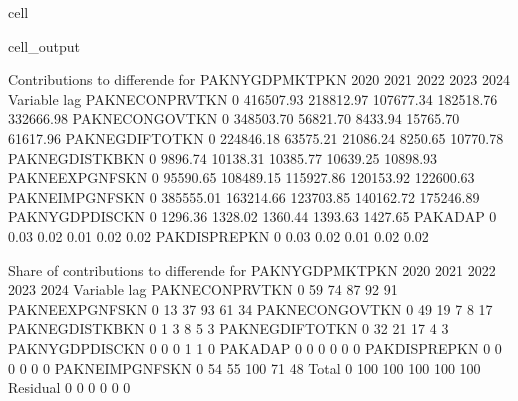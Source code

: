 \documentclass[letterpaper,10pt,english]{jupyterBook}
\begin{document}
\begin{sphinxuseclass}{cell}
\begin{sphinxVerbatimOutput}
\begin{sphinxuseclass}{cell_output}
\begin{sphinxVerbatim}[commandchars=\\\{\}]
 Contributions to differende for  PAKNYGDPMKTPKN
                         2020       2021       2022       2023       2024
Variable       lag                                                       
PAKNECONPRVTKN 0    416507.93  218812.97  107677.34  182518.76  332666.98
PAKNECONGOVTKN 0    348503.70   56821.70   \PYGZhy{}8433.94   15765.70   61617.96
PAKNEGDIFTOTKN 0    224846.18   63575.21   21086.24    8250.65   10770.78
PAKNEGDISTKBKN 0      9896.74   10138.31   10385.77   10639.25   10898.93
PAKNEEXPGNFSKN 0     95590.65  108489.15  115927.86  120153.92  122600.63
PAKNEIMPGNFSKN 0   \PYGZhy{}385555.01 \PYGZhy{}163214.66 \PYGZhy{}123703.85 \PYGZhy{}140162.72 \PYGZhy{}175246.89
PAKNYGDPDISCKN 0      1296.36    1328.02    1360.44    1393.63    1427.65
PAKADAP        0        \PYGZhy{}0.03      \PYGZhy{}0.02      \PYGZhy{}0.01      \PYGZhy{}0.02      \PYGZhy{}0.02
PAKDISPREPKN   0        \PYGZhy{}0.03      \PYGZhy{}0.02      \PYGZhy{}0.01      \PYGZhy{}0.02      \PYGZhy{}0.02

 Share of contributions to differende for  PAKNYGDPMKTPKN
                          2020        2021        2022        2023        2024
Variable       lag                                                            
PAKNECONPRVTKN 0           59\PYGZpc{}         74\PYGZpc{}         87\PYGZpc{}         92\PYGZpc{}         91\PYGZpc{}
PAKNEEXPGNFSKN 0           13\PYGZpc{}         37\PYGZpc{}         93\PYGZpc{}         61\PYGZpc{}         34\PYGZpc{}
PAKNECONGOVTKN 0           49\PYGZpc{}         19\PYGZpc{}         \PYGZhy{}7\PYGZpc{}          8\PYGZpc{}         17\PYGZpc{}
PAKNEGDISTKBKN 0            1\PYGZpc{}          3\PYGZpc{}          8\PYGZpc{}          5\PYGZpc{}          3\PYGZpc{}
PAKNEGDIFTOTKN 0           32\PYGZpc{}         21\PYGZpc{}         17\PYGZpc{}          4\PYGZpc{}          3\PYGZpc{}
PAKNYGDPDISCKN 0            0\PYGZpc{}          0\PYGZpc{}          1\PYGZpc{}          1\PYGZpc{}          0\PYGZpc{}
PAKADAP        0           \PYGZhy{}0\PYGZpc{}         \PYGZhy{}0\PYGZpc{}         \PYGZhy{}0\PYGZpc{}         \PYGZhy{}0\PYGZpc{}         \PYGZhy{}0\PYGZpc{}
PAKDISPREPKN   0           \PYGZhy{}0\PYGZpc{}         \PYGZhy{}0\PYGZpc{}         \PYGZhy{}0\PYGZpc{}         \PYGZhy{}0\PYGZpc{}         \PYGZhy{}0\PYGZpc{}
PAKNEIMPGNFSKN 0          \PYGZhy{}54\PYGZpc{}        \PYGZhy{}55\PYGZpc{}       \PYGZhy{}100\PYGZpc{}        \PYGZhy{}71\PYGZpc{}        \PYGZhy{}48\PYGZpc{}
Total          0          100\PYGZpc{}        100\PYGZpc{}        100\PYGZpc{}        100\PYGZpc{}        100\PYGZpc{}
Residual       0           \PYGZhy{}0\PYGZpc{}         \PYGZhy{}0\PYGZpc{}         \PYGZhy{}0\PYGZpc{}         \PYGZhy{}0\PYGZpc{}         \PYGZhy{}0\PYGZpc{}


\end{sphinxVerbatim}
\end{sphinxuseclass}
\end{sphinxVerbatimOutput}
\end{sphinxuseclass}
\end{document}
